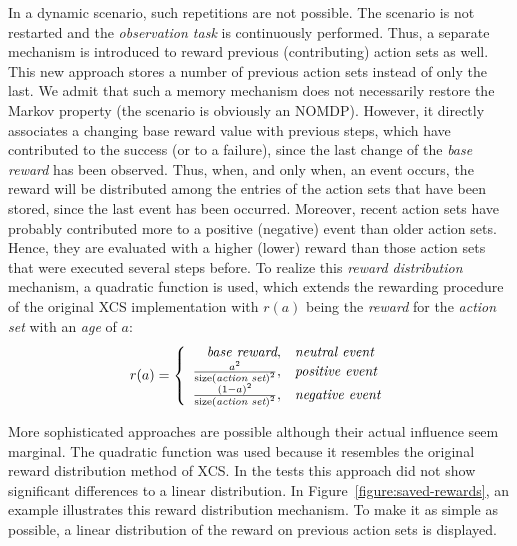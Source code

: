 In a dynamic scenario, such repetitions are not possible. The scenario is not restarted and the \emph{observation task} is continuously performed. Thus, a separate mechanism is introduced to reward previous (contributing) action sets as well. This new approach stores a number of previous action sets instead of only the last. We admit that such a memory mechanism does not necessarily restore the Markov property (the scenario is obviously an NOMDP). However, it directly associates a changing base reward value with previous steps, which have contributed to the success (or to a failure), since the last change of the \emph{base reward} has been observed. %
Thus, when, and only when, an event occurs, the reward will be distributed among the entries of the action sets that have been stored, since the last event has been occurred. Moreover, recent action sets have probably contributed more to a positive (negative) event than older action sets. Hence, they are evaluated with a higher (lower) reward than those action sets that were executed several steps before. To realize this \emph{reward distribution} mechanism, a quadratic function is used, which extends the rewarding procedure of the original XCS implementation with $r(a)$ being the \emph{reward} for the \emph{action set} with an \emph{age} of $a$:
$$ %
	r(a) = 
	\left\{ \begin{array}{r@{,\quad}l}
		\emph{base reward} & \mbox{\emph{neutral event}}\\  	
		\frac{{a}^{2}}{{\mathrm{size(\emph{action set})}}^{2}} & \mbox{\emph{positive event}} \\
  		\frac{{(1 - a)}^{2}}{{\mathrm{size(\emph{action set})}}^{2}} & \mbox{\emph{negative event}}
  	\end{array} \right.
$$ %

More sophisticated approaches are possible although their actual influence seem marginal. The quadratic function was used because it resembles the original reward distribution method of XCS. In the tests this approach did not show significant differences to a linear distribution. In Figure~\ref{figure:saved-rewards}, an example illustrates this reward distribution mechanism. To make it as simple as possible, a linear distribution of the reward on previous action sets is displayed.  

